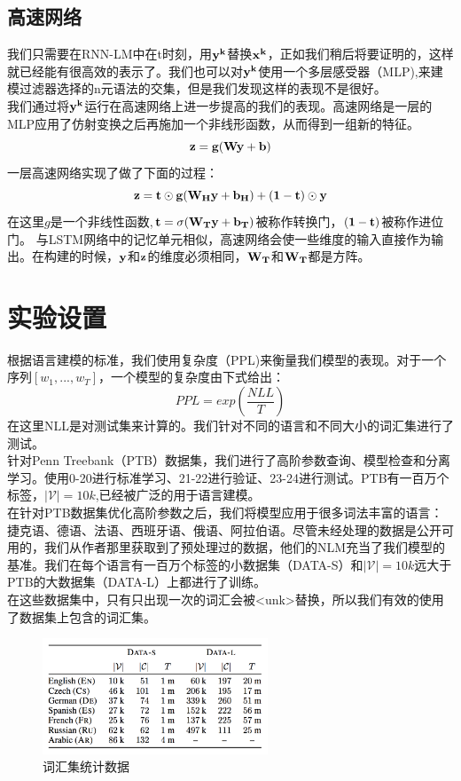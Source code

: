 \subsection{高速网络}
我们只需要在RNN-LM中在t时刻，用$\bf{y}^k$替换$\bf{x}^k$，正如我们稍后将要证明的，这样就已经能有很高效的表示了。我们也可以对$\bf{y}^k$使用一个多层感受器（MLP),来建模过滤器选择的n元语法的交集，但是我们发现这样的表现不是很好。\\
我们通过将$\bf{y}^k$运行在高速网络上进一步提高的我们的表现。高速网络是一层的MLP应用了仿射变换之后再施加一个非线形函数，从而得到一组新的特征。\\
\begin{equation}
\bf{z} = g(\bf{Wy} + \bf{b})
\end{equation}
一层高速网络实现了做了下面的过程：\\
\begin{equation}
\bf{z} = \bf{t} \odot g(\bf{W}_H\bf{y}+\bf{b}_H) + (\bf{1} - \bf{t})\odot \bf{y}
\end{equation}
在这里$g$是一个非线性函数,$\bf{t} = \sigma(\bf{W}_T\bf{y}+\bf{b}_T)$被称作转换门，$ (\bf{1} - \bf{t})$被称作进位门。
与LSTM网络中的记忆单元相似，高速网络会使一些维度的输入直接作为输出。在构建的时候，$\bf{y}$和$\bf{z}$的维度必须相同，$\bf{W}_T$和$\bf{W}_T$都是方阵。

\section{实验设置}
根据语言建模的标准，我们使用复杂度（PPL)来衡量我们模型的表现。对于一个序列$[w_1,...,w_T]$，一个模型的复杂度由下式给出：\\
\begin{equation}
  PPL = exp(\frac{NLL}{T})
\end{equation}
在这里NLL是对测试集来计算的。我们针对不同的语言和不同大小的词汇集进行了测试。\\
针对Penn Treebank（PTB）数据集，我们进行了高阶参数查询、模型检查和分离学习。使用0-20进行标准学习、21-22进行验证、23-24进行测试。PTB有一百万个标签，$| \mathscr{V} | = 10k$,已经被广泛的用于语言建模。\\
在针对PTB数据集优化高阶参数之后，我们将模型应用于很多词法丰富的语言：捷克语、德语、法语、西班牙语、俄语、阿拉伯语。尽管未经处理的数据是公开可用的，我们从作者那里获取到了预处理过的数据，他们的NLM充当了我们模型的基准。我们在每个语言有一百万个标签的小数据集（DATA-S）和$| \mathscr{V} | = 10k$远大于PTB的大数据集（DATA-L）上都进行了训练。\\
在这些数据集中，只有只出现一次的词汇会被<unk>替换，所以我们有效的使用了数据集上包含的词汇集。\\
\begin{figure}[h]
  \centering
  \includegraphics[width=0.6\textwidth]{./images/table1}
  \caption{词汇集统计数据}
\end{figure}


